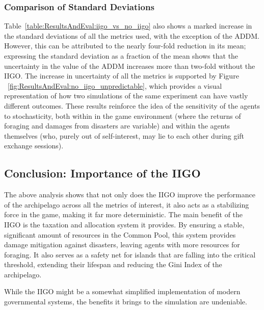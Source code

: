 \subsubsection{Comparison of Standard Deviations}
\label{subsec:ResultsAndEval:no-iigo:comparison_of_std_devs}
Table~\ref{table:ResultsAndEval:iigo_vs_no_iigo} also shows a marked increase in the standard deviations of all the metrics used, with the exception of the ADDM. However, this can be attributed to the nearly four-fold reduction in its mean; expressing the standard deviation as a fraction of the mean shows that the uncertainty in the value of the ADDM increases more than two-fold without the IIGO.
The increase in uncertainty of all the metrics is supported by Figure ~\ref{fig:ResultsAndEval:no_iigo_unpredictable}, which provides a visual representation of how two simulations of the same experiment can have vastly different outcomes. 
These results reinforce the idea of the sensitivity of the agents to stochasticity, both within in the game environment (where the returns of foraging and damages from disasters are variable) and within the agents themselves (who, purely out of self-interest, may lie to each other during gift exchange sessions).


\subsection{Conclusion: Importance of the IIGO}
\label{subsec:Simulations:no-iigo:conclusion}

The above analysis shows that not only does the IIGO improve the performance of the archipelago across all the metrics of interest, it also acts as a stabilizing force in the game, making it far more deterministic. 
The main benefit of the IIGO is the taxation and allocation system it provides. By ensuring a stable, significant amount of resources in the Common Pool, this system provides damage mitigation against disasters, leaving agents with more resources for foraging. 
It also serves as a safety net for islands that are falling into the critical threshold, extending their lifespan and reducing the Gini Index of the archipelago.

While the IIGO might be a somewhat simplified implementation of modern governmental systems, the benefits it brings to the simulation are undeniable.
